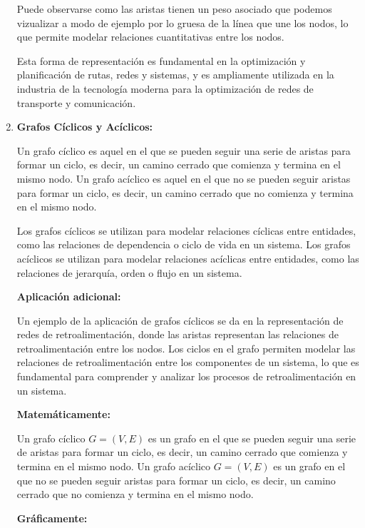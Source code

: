 \documentclass[11pt, a4paper]{article}
\begin{document}
\begin{enumerate}
Puede observarse como las aristas tienen un peso asociado que podemos vizualizar a modo de ejemplo por lo gruesa de la línea que une los nodos, lo que permite modelar relaciones cuantitativas entre los nodos.

Esta forma de representación es fundamental en la optimización y planificación de rutas, redes y sistemas, y es ampliamente utilizada en la industria de la tecnología moderna para la optimización de redes de transporte y comunicación.

\newpage

\item \textbf{Grafos Cíclicos y Acíclicos:}

Un grafo cíclico es aquel en el que se pueden seguir una serie de aristas para formar un ciclo, es decir, un camino cerrado que comienza y termina en el mismo nodo. Un grafo acíclico es aquel en el que no se pueden seguir aristas para formar un ciclo, es decir, un camino cerrado que no comienza y termina en el mismo nodo.

Los grafos cíclicos se utilizan para modelar relaciones cíclicas entre entidades, como las relaciones de dependencia o ciclo de vida en un sistema. Los grafos acíclicos se utilizan para modelar relaciones acíclicas entre entidades, como las relaciones de jerarquía, orden o flujo en un sistema.

\textbf{Aplicación adicional:}

Un ejemplo de la aplicación de grafos cíclicos se da en la representación de redes de retroalimentación, donde las aristas representan las relaciones de retroalimentación entre los nodos. Los ciclos en el grafo permiten modelar las relaciones de retroalimentación entre los componentes de un sistema, lo que es fundamental para comprender y analizar los procesos de retroalimentación en un sistema.

\textbf{Matemáticamente:}

Un grafo cíclico $G = (V, E)$ es un grafo en el que se pueden seguir una serie de aristas para formar un ciclo, es decir, un camino cerrado que comienza y termina en el mismo nodo. Un grafo acíclico $G = (V, E)$ es un grafo en el que no se pueden seguir aristas para formar un ciclo, es decir, un camino cerrado que no comienza y termina en el mismo nodo.

\textbf{Gráficamente:}

\begin{figure}[H]
  \centering
\end{figure}
\end{enumerate}
\end{document}
